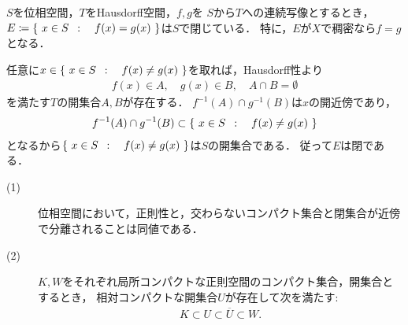 	\begin{screen}
		\begin{thm}[Hausdorff空間値連続写像の等価域は閉]
			$S$を位相空間，$T$をHausdorff空間，$f,g$を
			$S$から$T$への連続写像とするとき，$E \coloneqq \left\{\ x \in S\ \, : \quad f(x) = g(x)\ \right\}$は$S$で閉じている．
			特に，$E$が$X$で稠密なら$f=g$となる．
		\end{thm}
	\end{screen}
	
	\begin{prf}
		任意に$x \in \left\{\ x \in S\ \, : \quad f(x) \neq g(x)\ \right\}$を取れば，Hausdorff性より
		\begin{align}
			f(x) \in A,\quad g(x) \in B,\quad A \cap B = \emptyset
		\end{align}
		を満たす$T$の開集合$A,B$が存在する．
		$f^{-1}(A) \cap g^{-1}(B)$は$x$の開近傍であり，
		\begin{align}
			f^{-1}(A) \cap g^{-1}(B) \subset \left\{\ x \in S\ \, : \quad f(x) \neq g(x)\ \right\}
		\end{align}
		となるから$\left\{\ x \in S\ \, : \quad f(x) \neq g(x)\ \right\}$は$S$の開集合である．
		従って$E$は閉である．
		\QED
	\end{prf}
	
	\begin{screen}
		\begin{thm}[正則空間とは交わらないコンパクト集合と閉集合が近傍で分離できる空間]
		\label{thm:each_point_in_regular_space_has_closesd_local_base}\mbox{}
			\begin{description}
				\item[(1)] 位相空間において，正則性と，交わらないコンパクト集合と閉集合が近傍で分離されることは同値である．
					
				\item[(2)]
					$K,W$をそれぞれ局所コンパクトな正則空間のコンパクト集合，開集合とするとき，
					相対コンパクトな開集合$U$が存在して次を満たす:
					\begin{align}
						K \subset U \subset \overline{U} \subset W.
						\label{eq:thm_each_point_in_regular_space_has_closesd_local_base}
					\end{align}
			\end{description}
		\end{thm}
	\end{screen}
	
